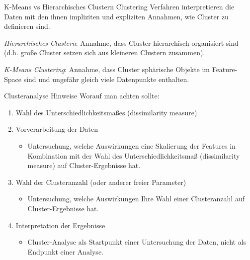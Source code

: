 \begin{bonus}{K-Means vs Hierarchisches Clustern}
    Clustering Verfahren interpretieren die Daten mit den ihnen impliziten und expliziten Annahmen, wie Cluster zu definieren sind.

    \emph{Hierarchisches Clustern}: Annahme, dass Cluster hierarchisch organisiert sind (d.h. große Cluster setzen sich aus kleineren Clustern zusammen).

    \emph{K-Means Clustering}: Annahme, dass Cluster sphärische Objekte im Feature-Space sind und ungefähr gleich viele Datenpunkte enthalten.
\end{bonus}

\begin{bonus}{Clusteranalyse Hinweise}
    Worauf man achten sollte:
    \begin{enumerate}
        \item Wahl des Unterschiedlichkeitsmaßes (dissimilarity measure)
        \item Vorverarbeitung der Daten
              \begin{itemize}
                  \item Untersuchung, welche Auswirkungen eine Skalierung der Features in Kombination mit der Wahl des Unterschiedlichkeitsmaß (dissimilarity measure) auf Cluster-Ergebnisse hat.
              \end{itemize}
        \item Wahl der Clusteranzahl (oder anderer freier Parameter)
              \begin{itemize}
                  \item Untersuchung, welche Auswirkungen Ihre Wahl einer Clusteranzahl auf Cluster-Ergebnisse hat.
              \end{itemize}
        \item Interpretation der Ergebnisse
              \begin{itemize}
                  \item Cluster-Analyse als Startpunkt einer Untersuchung der Daten, nicht als Endpunkt einer Analyse.
              \end{itemize}
    \end{enumerate}
\end{bonus}